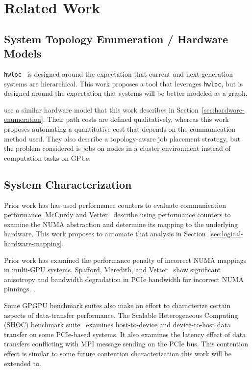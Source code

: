 \chapter{Related Work}
\label{ch:related}


\section{System Topology Enumeration / Hardware Models}

\texttt{hwloc}~\cite{broquedis2010hwloc} is designed around the expectation that current and next-generation systems are hierarchical.
This work proposes a tool that leverages \texttt{hwloc}, but is designed around the expectation that systems will be better modeled as a graph.

\cite{amaral2017topology} use a similar hardware model that this work describes in Section~\ref{sec:hardware-enumeration}.
Their path costs are defined qualitatively, whereas this work proposes automating a quantitative cost that depends on the communication method used.
They also describe a topology-aware job placement strategy, but the problem considered is jobs on nodes in a cluster environment instead of computation tasks on GPUs.

\section{System Characterization}

Prior work has has used performance counters to evaluate communication performance.
McCurdy and Vetter~\cite{mccurdy2010memphis} describe using performance counters to examine the NUMA abstraction and determine its mapping to the underlying hardware.
This work proposes to automate that analysis in Section~\ref{sec:logical-hardware-mapping}.

Prior work has examined the performance penalty of incorrect NUMA mappings in multi-GPU systems.
Spafford, Meredith, and Vetter~\cite{spafford2011quantifying} show significant anisotropy and bandwidth degradation in PCIe bandwidth for incorrect NUMA pinnings. .

Some GPGPU benchmark suites also make an effort to characterize certain aspects of data-transfer performance.
The Scalable Heterogeneous Computing (SHOC) benchmark suite~\cite{danalis2010scalable} examines host-to-device and device-to-host data transfer on some PCIe-based systems.
It also examines the latency effect of data transfers conflicting with MPI message sending on the PCIe bus.
This contention effect is similar to some future contention characterization this work will be extended to.


